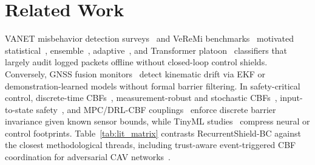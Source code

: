 \documentclass[journal]{IEEEtran}
\begin{document}
\section{Related Work}
VANET misbehavior detection surveys~\cite{vanderheijden2019} and VeReMi benchmarks~\cite{kamel2020veremi,kamel2020tvt} motivated statistical~\cite{sharma2021iotj}, ensemble~\cite{anyanwu2023tits}, adaptive~\cite{sultana2024ladetects}, and Transformer platoon~\cite{li2025attentionguard} classifiers that largely audit logged packets offline without closed-loop control shields. Conversely, GNSS fusion monitors~\cite{shen2020drift,dasgupta2022gnss,yang2023gps} detect kinematic drift via EKF or demonstration-learned models without formal barrier filtering. In safety-critical control, discrete-time CBFs~\cite{agrawal2017dcbf,ames2019cbf}, measurement-robust and stochastic CBFs~\cite{dean2020corl,cosner2021mrcbf,cosner2023rss,cosner2024freedman}, input-to-state safety~\cite{alan2023issf}, and MPC/DRL-CBF couplings~\cite{zeng2021mpccbf,cheng2019rlcbf,zhang2025cbfdrl,udatha2023pcbf} enforce discrete barrier invariance given known sensor bounds, while TinyML studies~\cite{david2021tflm,bove2024tinyml,li2025embedded} compress neural or control footprints. Table~\ref{tab:lit_matrix} contrasts RecurrentShield-BC against the closest methodological threads, including trust-aware event-triggered CBF coordination for adversarial CAV networks~\cite{ahmad2024trustcbf}.

\begin{table}[t]
\centering
\caption{Comparison Against Closest V2X/GNSS IDS and DT-CBF Studies}
\label{tab:lit_matrix}
\scriptsize
\setlength{\tabcolsep}{1.4pt}
\end{table}
\end{document}
